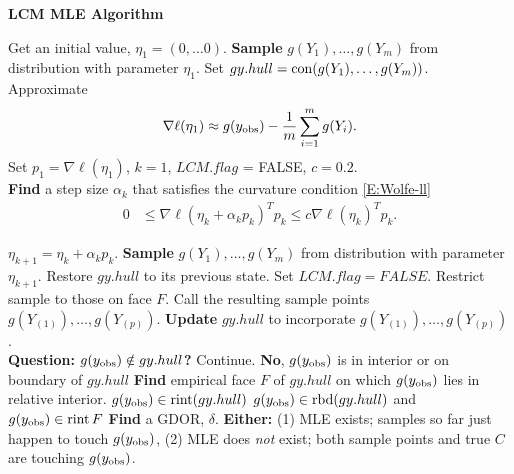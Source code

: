 {\small
\noindent \textbf{LCM MLE Algorithm}

\noindent \begin{algorithmic}
\State Get an initial value, $\eta_1 = (0, \ldots 0)$.
\State \textbf{Sample} $g(Y_1), \ldots, g(Y_m)$ from distribution with parameter $\eta_{1}$.  
\State Set $gy.hull = \operatorname{con}(g(Y_1), \ldots, g(Y_m) )$.
\State Approximate 
\begin{align*}
\nabla \ell( \eta_1) \approx g(y_{\text{obs}}) - \frac{1}{m}\sum_{i=1}^m g(Y_i).
\end{align*}
\State Set $p_1 = \nabla \ell( \eta_1)$, $k=1$, $LCM.flag$ = FALSE, $c=0.2$.\\

\State \textbf{Find} a step size $\alpha_k$ that satisfies the curvature condition \eqref{E:Wolfe-ll}
\begin{align*}%
	 0 & \leq \nabla \ell( \eta_k + \alpha_k p_k)^T p_k \leq c \nabla \ell(\eta_k)^T p_k.
\end{align*}

\State $\eta_{k+1} = \eta_k + \alpha_k p_k$.
\State \textbf{Sample} $g(Y_1), \ldots, g(Y_m)$ from distribution with parameter $\eta_{k+1}$.
		\State Restore $gy.hull$ to its previous state.
		\State Set $LCM.flag = FALSE$.
	\Else
		\State Restrict sample to those on face $F$.
	\EndIf
\EndIf
\State Call the resulting sample points $g(Y_{(1)}), \ldots, g(Y_{(p)})$.
\State \textbf{Update} $gy.hull$ to incorporate $g(Y_{(1)}), \ldots, g(Y_{(p)}) $.\\
\State \textbf{Question: $g(y_{\text{obs}}) \notin gy.hull$?}
	\State  Continue.
\Else
\State \textbf{No}, $g(y_{\text{obs}})$ is in interior or on boundary of $gy.hull$
	\State \textbf{Find} empirical face $F$ of $gy.hull$ on which $g(y_{\text{obs}})$ 
	lies in relative interior.
		\State $g(y_{\text{obs}}) \in \operatorname{rint}( gy.hull )$ 
	\Else
	\State $g(y_{\text{obs}}) \in \operatorname{rbd}( gy.hull )$ and $g(y_{\text{obs}}) \in \operatorname{rint} F$
		\State \textbf{Find} a GDOR, $\delta$.
		\State \textbf{Either:}
		\State (1) MLE exists; samples so far just happen to touch $g(y_{\text{obs}})$, 
		\State (2) MLE does \emph{not} exist; both sample points and true $C$ are
		touching $g(y_{\text{obs}})$.


\end{algorithmic}}
